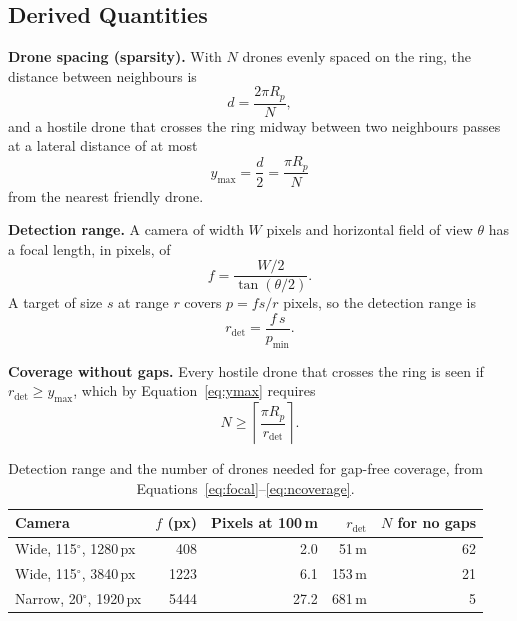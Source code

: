 \documentclass{article}
\begin{document}
\subsection{Derived Quantities}
\label{sec:derived}

\textbf{Drone spacing (sparsity).} With $N$ drones evenly spaced on the ring,
the distance between neighbours is
\begin{equation}
  d = \frac{2\pi R_p}{N},
  \label{eq:spacing}
\end{equation}
and a hostile drone that crosses the ring midway between two neighbours passes
at a lateral distance of at most
\begin{equation}
  y_{\max} = \frac{d}{2} = \frac{\pi R_p}{N}
  \label{eq:ymax}
\end{equation}
from the nearest friendly drone.

\textbf{Detection range.} A camera of width $W$ pixels and horizontal field of
view $\theta$ has a focal length, in pixels, of
\begin{equation}
  f = \frac{W/2}{\tan(\theta/2)}.
  \label{eq:focal}
\end{equation}
A target of size $s$ at range $r$ covers $p = f s / r$ pixels, so the
detection range is
\begin{equation}
  r_{\mathrm{det}} = \frac{f\,s}{p_{\min}}.
  \label{eq:rdet}
\end{equation}

\textbf{Coverage without gaps.} Every hostile drone that crosses the ring is
seen if $r_{\mathrm{det}} \geq y_{\max}$, which by Equation~\eqref{eq:ymax}
requires
\begin{equation}
  N \geq \left\lceil \frac{\pi R_p}{r_{\mathrm{det}}} \right\rceil.
  \label{eq:ncoverage}
\end{equation}

\begin{table}[H]
\centering
\small
\begin{tabular}{|l|r|r|r|r|}
\hline
\textbf{Camera} & $f$ (px) & Pixels at 100\,m & $r_{\mathrm{det}}$ & $N$ for no gaps \\
\hline
Wide, 115$^\circ$, 1280\,px & 408 & 2.0 & 51\,m & 62 \\
Wide, 115$^\circ$, 3840\,px & 1223 & 6.1 & 153\,m & 21 \\
Narrow, 20$^\circ$, 1920\,px & 5444 & 27.2 & 681\,m & 5 \\
\hline
\end{tabular}
\caption{Detection range and the number of drones needed for gap-free
coverage, from Equations~\eqref{eq:focal}--\eqref{eq:ncoverage}.}
\label{tab:coverage}
\end{table}
\end{document}
